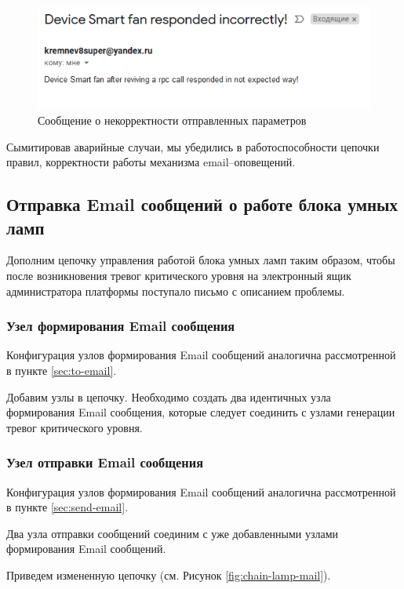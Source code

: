 \documentclass[a4paper,14pt]{extarticle}
\begin{document}
\begin{figure}[h!]
	\centering
	\includegraphics[width=0.76\linewidth]{images/t1-p2-alarm-email}
	\caption{Сообщение о некорректности отправленных параметров}
	\label{fig:t1-p2-alarm-email}
\end{figure}
Сымитировав аварийные случаи, мы убедились в работоспособности цепочки правил, корректности работы механизма \mbox{email--оповещений}.  

\subsection{Отправка Email сообщений о работе блока умных ламп}

Дополним цепочку управления работой блока умных ламп таким образом, чтобы после возникновения тревог критического уровня на электронный ящик администратора платформы поступало письмо с описанием проблемы.
\subsubsection*{Узел формирования Email сообщения}
Конфигурация узлов формирования Email сообщений аналогична рассмотренной в пункте \ref{sec:to-email}.

Добавим узлы в цепочку. Необходимо создать два идентичных узла формирования Email сообщения, которые следует соединить с узлами генерации тревог критического уровня.

\subsubsection*{Узел отправки Email сообщения}
Конфигурация узлов формирования Email сообщений аналогична рассмотренной в пункте \ref{sec:send-email}.

Два узла отправки сообщений соединим с уже добавленными узлами формирования Email сообщений.

Приведем измененную цепочку (см. Рисунок \ref{fig:chain-lamp-mail}).
\end{document}
